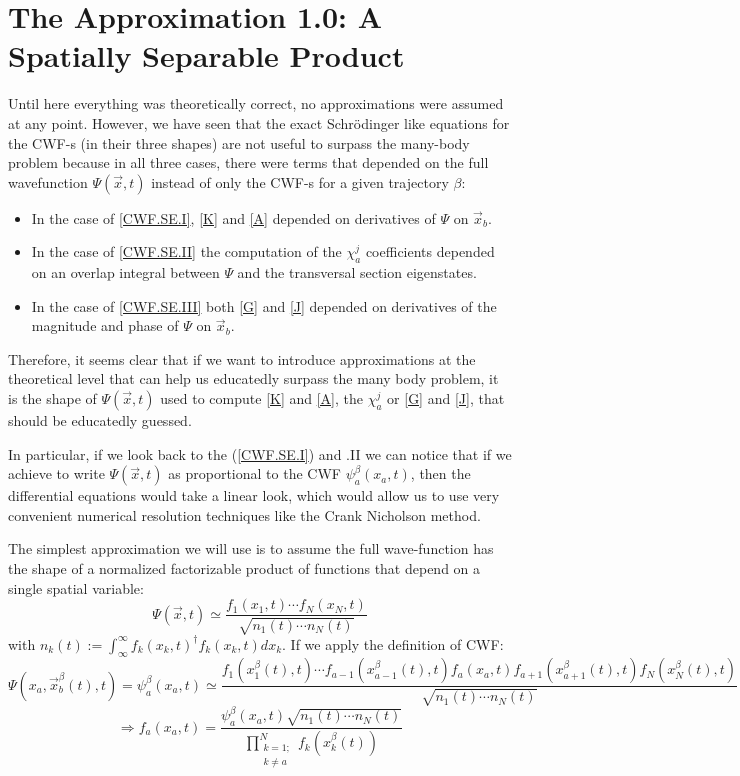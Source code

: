 \documentclass[11pt, a4paper]{article} %
\begin{document}
\newpage
\section{The Approximation 1.0: A Spatially Separable Product}

Until here everything was theoretically correct, no approximations were assumed at any point. However, we have seen that the exact Schrödinger like equations for the CWF-s (in their three shapes) are not useful to surpass the many-body problem because in all three cases, there were terms that depended on the full wavefunction $\Psi(\vec{x},t)$ instead of only the CWF-s for a given trajectory $\beta$:\vspace{-0.3cm}
\begin{itemize}
\item In the case of \ref{CWF.SE.I}, \ref{K} and \ref{A} depended on derivatives of $\Psi$ on $\vec{x}_b$.

\item In the case of \ref{CWF.SE.II} the computation of the $\chi^j_a$ coefficients depended on an overlap integral between $\Psi$ and the transversal section eigenstates.

\item In the case of \ref{CWF.SE.III} both \ref{G} and \ref{J} depended on derivatives of the magnitude and phase of $\Psi$ on $\vec{x}_b$. 
\end{itemize} 
\vspace{-0.3cm}
Therefore, it seems clear that if we want to introduce approximations at the theoretical level that can help us educatedly surpass the many body problem, it is the shape of $\Psi(\vec{x},t)$ used to compute \ref{K} and \ref{A}, the $\chi_a^j$ or \ref{G} and \ref{J}, that should be educatedly guessed.

In particular, if we look back to the (\ref{CWF.SE.I}) and .II we can notice that if we achieve to write $\Psi(\vec{x},t)$ as proportional to the CWF $\psi_a^\beta(x_a,t)$, then the differential equations would take a linear look, which would allow us to use very convenient numerical resolution techniques like the Crank Nicholson method.

The simplest approximation we will use is to assume the full wave-function has the shape of a normalized factorizable product of functions that depend on a single spatial variable:
$$
\Psi(\vec{x},t)\simeq \frac{f_1(x_1,t)\cdots f_N(x_N,t)}{\sqrt{n_1(t)\cdots n_N(t)}}
$$
with $n_k(t):=\int_{\infty}^\infty f_k(x_k,t)^\dagger f_k(x_k,t)dx_k$. If we apply the definition of CWF:
$$
\Psi(x_a, \vec{x}_b^\beta(t),t)=\psi_a^\beta(x_a,t)\simeq  \frac{f_1(x_1^\beta(t),t)\cdots f_{a-1}(x_{a-1}^\beta(t),t)f_{a}(x_a,t)f_{a+1}(x_{a+1}^\beta(t),t)f_N(x_N^\beta(t),t)}{\sqrt{n_1(t)\cdots n_N(t)}}
$$
$$
\Longrightarrow f_a(x_a,t)=\frac{\psi_a^\beta(x_a,t) \sqrt{n_1(t)\cdots n_N(t)}}{\prod_{\substack{k=1; \\ k\neq a}}^{N} f_k(x_k^\beta(t))}
$$
\end{document}
